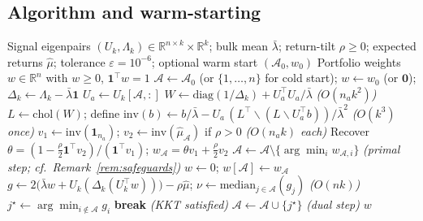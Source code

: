 \subsection{Algorithm and warm-starting}

\begin{algorithm}[ht]
\caption{Woodbury portfolio solver}\label{alg:woodbury}
\begin{algorithmic}[1]
\Require Signal eigenpairs $(U_k, \Lambda_k) \in \mathbb{R}^{n \times k} \times \mathbb{R}^k$;
         bulk mean $\bar\lambda$;
         return-tilt $\rho \geq 0$; expected returns $\hat\mu$;
         tolerance $\varepsilon = 10^{-6}$;
         optional warm start $(\mathcal{A}_0, w_0)$
\Ensure  Portfolio weights $w \in \mathbb{R}^n$ with $w \geq 0$, $\mathbf{1}^\top w = 1$
\State $\mathcal{A} \leftarrow \mathcal{A}_0$ (or $\{1,\ldots,n\}$ for cold start);\;
       $w \leftarrow w_0$ (or $\mathbf{0}$);\;
       $\Delta_k \leftarrow \Lambda_k - \bar\lambda\mathbf{1}$
\Loop
  \State $U_a \leftarrow U_k[\mathcal{A}, :]$ 
  \State $W \leftarrow \mathrm{diag}(1/\Delta_k) + U_a^\top U_a / \bar\lambda$
    \hfill\textit{($O(n_a k^2)$)}
  \State $L \leftarrow \mathrm{chol}(W)$;\;
         define $\mathrm{inv}(b) \leftarrow b/\bar\lambda - U_a\,(L^\top \backslash (L \backslash U_a^\top b)) / \bar\lambda^2$
    \hfill\textit{($O(k^3)$ once)}
  \State $v_1 \leftarrow \mathrm{inv}(\mathbf{1}_{n_a})$;\;
         $v_2 \leftarrow \mathrm{inv}(\hat\mu_\mathcal{A})$ if $\rho > 0$
    \hfill\textit{($O(n_a k)$ each)}
  \State Recover $\theta = (1 - \tfrac{\rho}{2}\mathbf{1}^\top v_2) / (\mathbf{1}^\top v_1)$;\;
         $w_\mathcal{A} = \theta v_1 + \tfrac{\rho}{2} v_2$
    \State $\mathcal{A} \leftarrow \mathcal{A} \setminus \{\arg\min_i w_{\mathcal{A},i}\}$
      \hfill\textit{(primal step; cf.\ Remark~\ref{rem:safeguards})}
  \Else
    \State $w \leftarrow 0$;\; $w[\mathcal{A}] \leftarrow w_\mathcal{A}$
    \State $g \leftarrow 2\bigl(\bar\lambda w + U_k(\Delta_k(U_k^\top w))\bigr) - \rho\hat\mu$;\;
           $\nu \leftarrow \mathrm{median}_{j \in \mathcal{A}}(g_j)$
      \hfill\textit{($O(nk)$)}
    \State $j^\star \leftarrow \arg\min_{i \notin \mathcal{A}} g_i$
     \textbf{break}
      \hfill\textit{(KKT satisfied)}
    \EndIf
    \State $\mathcal{A} \leftarrow \mathcal{A} \cup \{j^\star\}$
      \hfill\textit{(dual step)}
  \EndIf
\EndLoop
\State \Return $w$
\end{algorithmic}
\end{algorithm}


